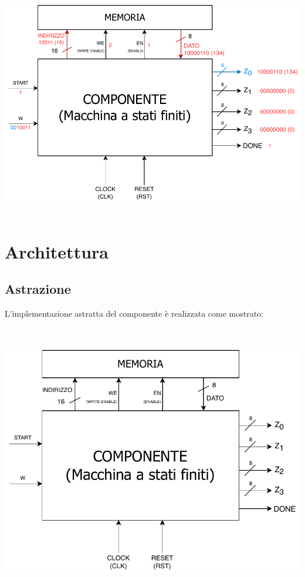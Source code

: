 \documentclass[a4paper,11pt]{article} %
\begin{document}
    \medskip

    \includegraphics[height=10cm]{../res/disegno-esempio-introduzione}

    \newpage


    \section{Architettura}\label{sec:architettura}

    \subsection{Astrazione}\label{subsec:astrazione}
    L'implementazione astratta del componente è realizzata come mostrato:

    \medskip

    \includegraphics[height=12cm]{../res/disegno-circuito-fsm}
\end{document}
